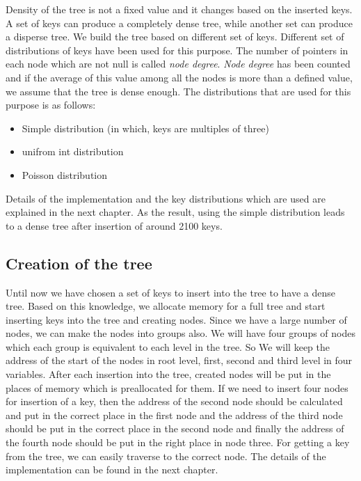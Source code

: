 \documentclass{report}
\begin{document}
Density of the tree is not a fixed value and it changes based on the inserted keys. A set of keys can produce a completely dense tree, while another set can produce a disperse tree.
 We build the tree based on different set of keys. Different set of distributions of keys have been used for this purpose. The number of pointers in each node which are not null is called \textit{node degree}. \textit{Node degree} has been counted and if the average of this value among all the nodes is more than a defined value, we assume that the tree is dense enough. The distributions that are used for this purpose is as follows:
 \begin{itemize}
 \item Simple distribution (in which, keys are multiples of three)
 \item unifrom int distribution
 \item Poisson distribution
 \end{itemize}
Details of the implementation and the key distributions which are used are explained in the next chapter. As the result, using the simple distribution leads to a dense tree after insertion of around 2100 keys.
 
\subsection{Creation of the tree}
  
Until now we have chosen a set of keys to insert into the tree to have a dense tree. Based on this knowledge, we allocate memory for a full tree and start inserting keys into the tree and creating nodes. Since we have a large number of nodes, we can make the nodes into groups also. We will have four groups of nodes which each group is equivalent to each level in the tree. So We will keep the address of the start of the nodes in root level, first, second and third level in four variables. After each insertion into the tree, created nodes will be put in the places of memory which is preallocated for them. If we need to insert four nodes for insertion of a key, then the address of the second node should be calculated and put in the correct place in the first node and the address of the third node should be put in the correct place in the second node and finally the address of the fourth node should be put in the right place in node three. For getting a key from the tree, we can easily traverse to the correct node. The details of the implementation can be found in the next chapter. 
\end{document}
